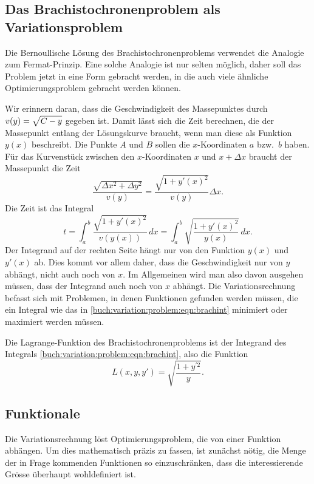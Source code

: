 %
%
\subsection{Das Brachistochronenproblem als Variationsproblem
\label{buch:variation:problem:subsection:variationsproblem}}
Die Bernoullische Lösung des Brachistochronenproblems verwendet die
Analogie zum Fermat-Prinzip.
%
Eine solche Analogie ist nur selten möglich, daher soll das Problem
jetzt in eine Form gebracht werden, in die auch viele ähnliche
Optimierungsproblem gebracht werden können.

Wir erinnern daran, dass die Geschwindigkeit des Massepunktes durch
$v(y)=\sqrt{C-y\mathstrut}$ gegeben ist.
Damit lässt sich die Zeit berechnen, die der Massepunkt entlang der
Lösungskurve braucht, wenn man diese als Funktion $y(x)$ beschreibt.
Die Punkte $A$ und $B$ sollen die $x$-Koordinaten $a$ bzw.~$b$ haben.
Für das Kurvenstück zwischen den $x$-Koordinaten $x$ und $x+\Delta x$
braucht der Massepunkt die Zeit
\[
\frac{ \sqrt{\Delta x^2 + \Delta y^2} }{v(y)}
=
\frac{ \sqrt{1 + y'(x)^2} }{ v(y) } \Delta x.
\]
Die Zeit ist das Integral
\begin{equation}
t
=
\int_a^b \frac{\sqrt{1+y'(x)^2}}{v(y(x))}\,dx
=
\int_a^b \sqrt{\frac{1+y'(x)^2}{y(x)}}\,dx.
\label{buch:variation:problem:eqn:brachint}
\end{equation}
Der Integrand auf der rechten Seite hängt nur von den Funktion $y(x)$
und $y'(x)$ ab.
Dies kommt vor allem daher, dass die Geschwindigkeit nur von $y$ abhängt,
nicht auch noch von $x$.
Im Allgemeinen wird man also davon ausgehen müssen, dass der Integrand
auch noch von $x$ abhängt.
Die Variationsrechnung befasst sich mit Problemen, in denen Funktionen
gefunden werden müssen, die ein Integral wie das in
\eqref{buch:variation:problem:eqn:brachint}
minimiert oder maximiert werden müssen.

\begin{definition}
Die Lagrange-Funk\-tion des Brachistochronenproblems ist der
Integrand des Integrals
\eqref{buch:variation:problem:eqn:brachint},
%
also die Funktion
\[
L(x,y,y')
=
\sqrt{\frac{1+y^{\prime 2}}{y}}.
\]
\end{definition}

%
%
\subsection{Funktionale
\label{buch:variation:problem:subsection:funktionale}}
Die Variationsrechnung löst Optimierungsproblem, die von einer
Funktion abhängen.
%
Um dies mathematisch präzis zu fassen, ist zunächst nötig, die Menge
der in Frage kommenden Funktionen so einzuschränken, dass die interessierende
Grösse überhaupt wohldefiniert ist.


